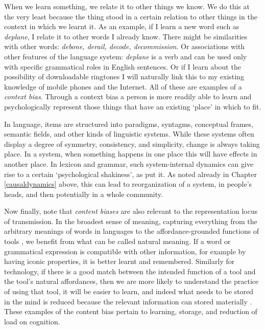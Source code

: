 When we learn something, we relate it to other things we know. We do this at the 
very least because the thing stood in a certain relation to other things in the context 
in which we learnt it. As an example, if I learn a new word such as 
\textit{deplane}, I relate it to other words I already know. There might be similarities with other words: \textit{debone, derail, decode, decommission}. Or associations with other features of the language system: \textit{deplane} is a verb and 
can be used only with specific grammatical roles in English sentences. 
Or if I learn about the possibility of downloadable ringtones I will 
naturally link this to my existing knowledge of mobile 
phones and the Internet. All of these are examples of a \textit{context bias}. Through a context bias  a person is more readily able 
to learn and psychologically represent those things that have an 
existing \textquoteleft place' in which to fit. 



In language, items are structured into paradigms, syntagms, conceptual frames, semantic fields, and other kinds of linguistic systems. While these systems often display a degree of symmetry, 
consistency, and simplicity, change is always taking place. In a system, when something happens in one place 
this will have effects in another place. In lexicon and grammar, such system-internal 
dynamics can give rise to a certain \textquoteleft psychological 
shakiness', as \citet{sapir_language:_1921} put it. As noted already in Chapter \ref{causaldynamics} above, this can lead to reorganization of 
a system, in people's heads, and then potentially in a whole community.



Now finally, note that \textit{content biases}  are also relevant to the representation locus of transmission. In the broadest sense of meaning, capturing everything from the 
arbitrary meanings of words in languages to the affordance-grounded 
functions of tools \citep{kockelman_residence_2006}, we benefit from what can be called 
natural meaning. If a word or grammatical expression is compatible with 
other information, for example by having iconic properties, it is better 
learnt and remembered. Similarly for technology, if there is a good match between the intended function of a tool and the tool's natural affordances, then we are more likely to understand the practice of using that tool, it 
will be easier to learn, and indeed what needs to be stored 
in the mind is reduced because the relevant information can 
stored materially \citep{norman_cognitive_1991}. These examples of the content bias pertain to learning, storage, and 
reduction of load on cognition. 


